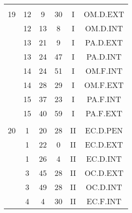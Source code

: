 \documentclass[12pt, a4paper]{article}
\begin{document}
\begin{multicols}{3}
{\begin{tabular}{c c c c c c}
	 	 	 	 & & & & & \\%
	 	 	 	19 & 12 & 9 & 30 & I & OM.D.EXT\\%
	 	 	 	 & 12 & 13 & 8 & I & OM.D.INT\\%
	 	 	 	 & 13 & 21 & 9 & I & PA.D.EXT\\%
	 	 	 	 & 13 & 24 & 47 & I & PA.D.INT\\%
	 	 	 	 & 14 & 24 & 51 & I & OM.F.INT\\%
	 	 	 	 & 14 & 28 & 29 & I & OM.F.EXT\\%
	 	 	 	 & 15 & 37 & 23 & I & PA.F.INT\\%
	 	 	 	 & 15 & 40 & 59 & I & PA.F.EXT\\%
	 	 	 	 & & & & & \\%
	 	 	 	20 & 1 & 20 & 28 & II & EC.D.PEN\\%
	 	 	 	 & 1 & 22 & 0 & II & EC.D.EXT\\%
	 	 	 	 & 1 & 26 & 4 & II & EC.D.INT\\%
	 	 	 	 & 3 & 45 & 28 & II & OC.D.EXT\\%
	 	 	 	 & 3 & 49 & 28 & II & OC.D.INT\\%
	 	 	 	 & 4 & 4 & 30 & II & EC.F.INT\\%
	 	 \end{tabular}
 	}
\end{multicols}
\end{document}
